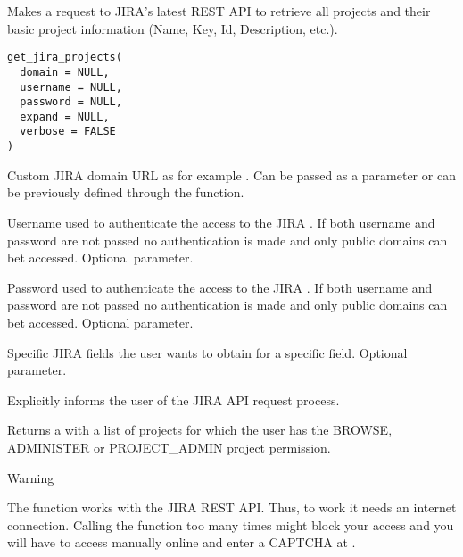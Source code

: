 \documentclass[a4paper]{book}
\begin{document}
%
\begin{Description}\relax
Makes a request to JIRA's latest REST API to retrieve all projects and their basic project information (Name, Key, Id, Description, etc.).
\end{Description}
%
\begin{Usage}
\begin{verbatim}
get_jira_projects(
  domain = NULL,
  username = NULL,
  password = NULL,
  expand = NULL,
  verbose = FALSE
)
\end{verbatim}
\end{Usage}
%
\begin{Arguments}
\begin{ldescription}
\item[\code{domain}] Custom JIRA domain URL as for example . Can be passed as a parameter or can be previously defined through the  function.

\item[\code{username}] Username used to authenticate the access to the JIRA . If both username and password are not passed no authentication is made and only public domains can bet accessed. Optional parameter.

\item[\code{password}] Password used to authenticate the access to the JIRA . If both username and password are not passed no authentication is made and only public domains can bet accessed. Optional parameter.

\item[\code{expand}] Specific JIRA fields the user wants to obtain for a specific field. Optional parameter.

\item[\code{verbose}] Explicitly informs the user of the JIRA API request process.
\end{ldescription}
\end{Arguments}
%
\begin{Value}
Returns a  with a list of projects for which the user has the BROWSE, ADMINISTER or PROJECT\_ADMIN project permission.
\end{Value}
%
\begin{Section}{Warning}

The function works with the JIRA REST API. Thus, to work it needs an internet connection. Calling the function too many times might block your access and you will have to access manually online and enter a CAPTCHA at .
\end{Section}
\end{document}
